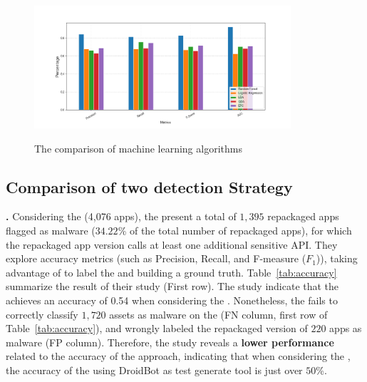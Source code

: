\begin{figure}[h]
  \centering
  
    \includegraphics[width=0.85\textwidth]{image/barGraphMetrics.png} \\[\abovecaptionskip]
    
  \caption{The comparison of machine learning algorithms}\label{fig:metrics}
\end{figure}


\subsection{Comparison of two detection Strategy}\label{sec:comparison}

{\bf \mas.} Considering the \cds (4,076 apps), the \fhc present
a total of {$1,395$} repackaged apps flagged as malware ({$34.22$\%} of the total number of repackaged apps), for which the repackaged app version calls at least one additional sensitive API. They explore accuracy metrics (such as Precision, Recall, and F-measure ($F_1$)), taking advantage of \vt to label the \cds and building a ground truth. Table~\ref{tab:accuracy} summarize the result of their study (First row). The study indicate that the \mas achieves an accuracy of 0.54 when considering the \cds. Nonetheless, the \mas fails to correctly classify $1,720$ assets as malware on the \cds (FN column, first row of Table~\ref{tab:accuracy}), and wrongly labeled the repackaged version of $220$ apps as malware (FP column). Therefore, the study reveals a {\bf lower performance} related to the accuracy of the approach, indicating that when considering the \cds, the accuracy of the \mas using DroidBot as test generate tool is just over $50$\%.

